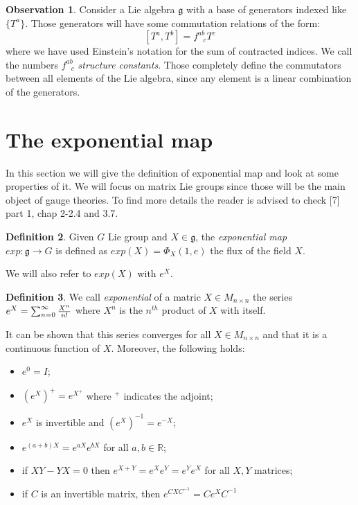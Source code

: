 \documentclass[12pt,a4paper]{report}
\theoremstyle{definition}
\newtheorem{Def}{Definition}[chapter]
\theoremstyle{Theorem}
\theoremstyle{definition}
\theoremstyle{definition}
\newtheorem{Obs}[Def]{Observation}
\begin{document}
	\begin{Obs}
		Consider a Lie algebra $\mathfrak{g}$ with a base of generators indexed like $\{T^a\}$. Those generators will have some commutation relations of the form:
		$$[T^a,T^b]=f^{ab}_{\hspace{9pt}c}T^c$$
		where we have used Einstein's notation for the sum of contracted indices. We call the numbers $f^{ab}_{\hspace{9pt}c}$ \textit{structure constants}. Those completely define the commutators between all elements of the Lie algebra, since any element is a linear combination of the generators.
	\end{Obs}
	\section{The exponential map}
	In this section we will give the definition of exponential map and look at some properties of it. We will focus on matrix Lie groups since those will be the main object of gauge theories.
	To find more details the reader is advised to check [7] part 1, chap 2-2.4 and 3.7.
	\begin{Def}
		Given $G$ Lie group and $X\in\mathfrak{g}$, the \textit{exponential map} \\$exp:\mathfrak{g}\rightarrow G$ is defined as $exp(X)=\Phi_X(1,e)$ the flux of the field $X$.
	\end{Def}
	We will also refer to $exp(X)$ with $e^X$.
	\begin{Def}
		We call \textit{exponential} of a matric $X\in M_{n\times n}$ the series \\$e^X=\sum_{n=0}^{\infty}{X^n\over n! }$ where $X^n$ is the $n^{th}$ product of $X$ with itself.
	\end{Def}
	It can be shown that this series converges for all $X\in M_{n\times n}$ and that it is a continuous function of $X$. Moreover, the following holds:
	\begin{itemize}
		\item $e^0=I$;
		\item $(e^X)^+=e^{X^+}$ where $^+$ indicates the adjoint;
		\item $e^X$ is invertible and $(e^X)^{-1}=e^{-X}$;
		\item $e^{(a+b)X}=e^{aX}e^{bX}$ for all $a,b\in\mathbb{R}$;
		\item if $XY-YX=0$ then $e^{X+Y}=e^Xe^Y=e^Ye^X$ for all $X,Y$ matrices;\\
		\item if $C$ is an invertible matrix, then $e^{CXC^{-1}}=Ce^XC^{-1}$
	\end{itemize} 
\end{document}
